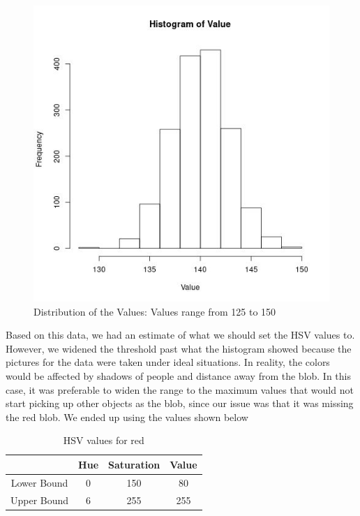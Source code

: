 \documentclass[journal, a4paper]{IEEEtran}
\begin{document}
\begin{figure}[H]
\includegraphics[scale=.50]{vplot.jpg}
\caption{Distribution of the Values: Values range from 125 to 150}
\end{figure}
Based on this data, we had an estimate of what we should set the HSV values to. However, we widened the threshold past what the histogram showed because the pictures for the data were taken under ideal situations. In reality, the colors would be affected by shadows of people and distance away from the blob. In this case, it was preferable to widen the range to the maximum values that would not start picking up other objects as the blob, since our issue was that it was missing the red blob. We ended up using the values shown below \\
    \begin{table}[!hbt]
        \begin{center}
        \caption{HSV values for red}
        \begin{tabular}{|c|c|c|c|}
            \hline
              & Hue & Saturation & Value\\
            \hline
            Lower Bound& 0 & 150 & 80 \\
            \hline
            Upper Bound & 6 & 255 & 255 \\
            \hline
        \end{tabular}
        \end{center}
    \end{table} \\
\end{document}
